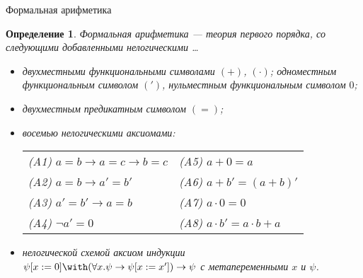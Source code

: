 \documentclass[handout]{beamer}
\newtheorem{dfn}{Определение}[section]
\begin{document}
\begin{frame}{Формальная арифметика}
\begin{dfn}
Формальная арифметика --- теория первого порядка, со следующими добавленными нелогическими \dots
\begin{itemize}
\item двухместными функциональными символами $(+)$, $(\cdot)$; одноместным функциональным символом $(')$, 
нульместным функциональным символом $0$;\pause
\item двухместным предикатным символом $(=)$;\pause
\item восемью нелогическими \emph{аксиомами}:\vspace{0.1cm}
\begin{tabular}{ll}
(A1) $a=b \to a=c \to b=c$             &(A5) $a+0 = a$                     \\
(A2) $a=b \to a'=b'$                   &(A6) $a+b' = (a+b)'$               \\
(A3) $a'=b' \to a=b$                   &(A7) $a\cdot 0 = 0$                \\
(A4) $\neg a' = 0$                     &(A8) $a\cdot b' = a \cdot b + a$
\end{tabular}\pause
\item нелогической схемой аксиом индукции $\psi[x:=0]\with(\forall x.\psi\to \psi[x:=x'])\to \psi$ с метапеременными $x$ и $\psi$.
\end{itemize}
\end{dfn}
\end{frame}
\end{document}
